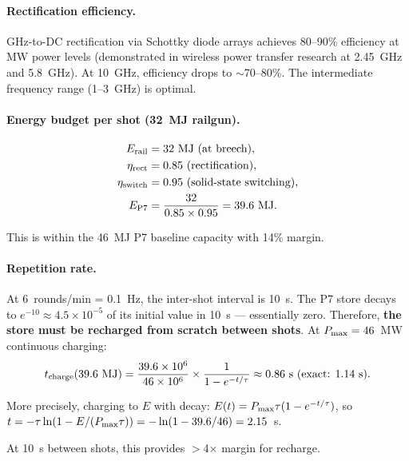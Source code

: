 \documentclass[11pt]{article}
\newcommand{\ee}[1]{\times 10^{#1}}
\newcommand{\Pmax}{P_{\rm max}}
\begin{document}
\paragraph{Rectification efficiency.} GHz-to-DC rectification via
Schottky diode arrays achieves 80--90\% efficiency at MW power levels
(demonstrated in wireless power transfer research at 2.45~GHz and
5.8~GHz). At 10~GHz, efficiency drops to $\sim$70--80\%. The
intermediate frequency range (1--3~GHz) is optimal.

\paragraph{Energy budget per shot (32~MJ railgun).}
\begin{align}
E_{\rm rail} &= 32~\text{MJ (at breech)}, \\
\eta_{\rm rect} &= 0.85~\text{(rectification)}, \\
\eta_{\rm switch} &= 0.95~\text{(solid-state switching)}, \\
E_{\rm P7} &= \frac{32}{0.85 \times 0.95} = 39.6~\text{MJ}.
\end{align}

This is within the 46~MJ P7 baseline capacity with 14\% margin.

\paragraph{Repetition rate.} At 6~rounds/min = 0.1~Hz, the inter-shot
interval is 10~s. The P7 store decays to $e^{-10} \approx 4.5\ee{-5}$
of its initial value in 10~s --- essentially zero. Therefore, \textbf{the
store must be recharged from scratch between shots}. At $\Pmax = 46$~MW
continuous charging:
\begin{equation}
t_{\rm charge}(39.6~\text{MJ}) = \frac{39.6\ee{6}}{46\ee{6}}
\times \frac{1}{1 - e^{-t/\tau}} \approx 0.86~\text{s (exact: 1.14~s)}.
\end{equation}

More precisely, charging to $E$ with decay:
$E(t) = \Pmax \tau (1 - e^{-t/\tau})$, so
$t = -\tau \ln(1 - E/(\Pmax\tau)) = -\ln(1 - 39.6/46) = 2.15$~s.

At 10~s between shots, this provides $>$4$\times$ margin for recharge.
\end{document}
